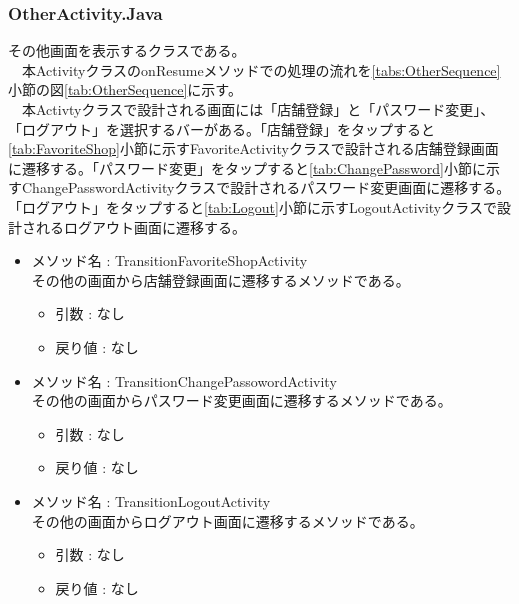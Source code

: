 \documentclass[a4j]{jarticle}
\begin{document}
\subsubsection{OtherActivity.Java}%
\label{tab:Other}
その他画面を表示するクラスである。\\
　本ActivityクラスのonResumeメソッドでの処理の流れを\ref{tabs:OtherSequence}小節の図\ref{tab:OtherSequence}に示す。\\
　本Activtyクラスで設計される画面には「店舗登録」と「パスワード変更」、「ログアウト」を選択するバーがある。「店舗登録」をタップすると\ref{tab:FavoriteShop}小節に示すFavoriteActivityクラスで設計される店舗登録画面に遷移する。「パスワード変更」をタップすると\ref{tab:ChangePassword}小節に示すChangePasswordActivityクラスで設計されるパスワード変更画面に遷移する。「ログアウト」をタップすると\ref{tab:Logout}小節に示すLogoutActivityクラスで設計されるログアウト画面に遷移する。
\begin{itemize}
\item メソッド名 : TransitionFavoriteShopActivity\\
  その他の画面から店舗登録画面に遷移するメソッドである。
  \begin{itemize}
  \item 引数 : なし
  \item 戻り値 : なし
  \end{itemize}

\item メソッド名 : TransitionChangePassowordActivity\\
  その他の画面からパスワード変更画面に遷移するメソッドである。
  \begin{itemize}
  \item 引数 : なし
  \item 戻り値 : なし
  \end{itemize}

\item メソッド名 : TransitionLogoutActivity\\
  その他の画面からログアウト画面に遷移するメソッドである。
  \begin{itemize}
  \item 引数 : なし
  \item 戻り値 : なし
  \end{itemize}
\end{itemize}
\end{document}
